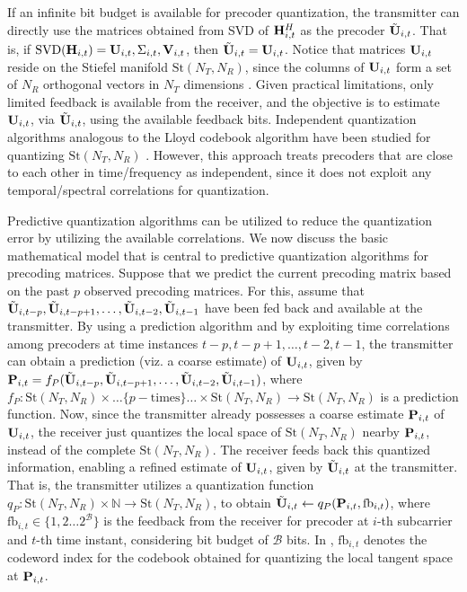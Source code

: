 \documentclass[conference]{IEEEtran}
\begin{document}
If an infinite bit budget is available for precoder quantization, the transmitter can directly use the matrices obtained from SVD of ${\bf H}^{H}_{i,t}$ as the precoder $\tilde{{\bf U}}_{i,t}$. 
That is, if $\text{SVD}({\bf H}_{i,t}) = {\bf U}_{i,t},\Sigma_{i,t}, {\bf V}_{i,t}$, then $\tilde{{\bf U}}_{i,t} = {\bf U}_{i,t}$.
Notice that matrices ${\bf U}_{i,t}$ reside on the Stiefel manifold $\text{St}(N_T,N_R)$, since the columns of ${\bf U}_{i,t}$ form a set of $N_R$ orthogonal vectors in $N_T$ dimensions \cite{Gupt1905:Predictive,6891198}.
Given practical limitations, only limited feedback is available from the receiver, and the objective is to estimate ${\bf U}_{i,t}$, via $\tilde{{\bf U}}_{i,t}$, using the available feedback bits. Independent quantization algorithms analogous to the Lloyd codebook algorithm have been studied for quantizing $\text{St}(N_T,N_R)$ \cite{6678348}.
However, this approach treats precoders that are close to each other in time/frequency as independent, since it does not exploit any temporal/spectral correlations for quantization.

Predictive quantization algorithms \cite{Gupt1905:Predictive,6891198} can be utilized to reduce the quantization error by utilizing the available correlations.
We now discuss the basic mathematical model that is central to predictive quantization algorithms for precoding matrices.
Suppose that we predict the current precoding matrix based on the past $p$ observed precoding matrices. For this, assume that $\tilde{{\bf U}}_{i,t-p},\tilde{{\bf U}}_{i,t-p+1},\ldots,\tilde{{\bf U}}_{i,t-2},\tilde{{\bf U}}_{i,t-1}$ have been fed back and available at the transmitter.
By using a prediction algorithm and by exploiting time correlations among precoders at time instances $t-p,t-p+1,\ldots,t-2,t-1$, the transmitter can obtain a prediction (viz. a coarse estimate) of ${\bf U}_{i,t}$, given by ${\bf P}_{i,t}=f_P(\tilde{{\bf U}}_{i,t-p},\tilde{{\bf U}}_{i,t-p+1},\ldots,\tilde{{\bf U}}_{i,t-2},\tilde{{\bf U}}_{i,t-1})$, where $f_P: \text{St}(N_T,N_R)\times\ldots\{p-\text{times}\}\ldots\times\text{St}(N_T,N_R) \to \text{St}(N_T,N_R)$ is a prediction function.
Now, since the transmitter already possesses a coarse estimate ${\bf P}_{i,t}$ of ${\bf U}_{i,t}$, the receiver just quantizes the local space of $\text{St}(N_T,N_R)$ nearby ${\bf P}_{i,t}$, instead of the complete $\text{St}(N_T,N_R)$. The receiver feeds back this quantized information, enabling a refined estimate of ${\bf U}_{i,t}$, given by $\tilde{{\bf U}}_{i,t}$ at the transmitter.
That is, the transmitter utilizes a quantization function $q_P:\text{St}(N_T,N_R) \times \mathbb{N} \to \text{St}(N_T,N_R)$, to obtain $\tilde{{\bf U}}_{i,t} \gets q_P({\bf P}_{i,t},\text{fb}_{i,t})$, where $\text{fb}_{i,t} \in \{1,2\ldots2^{\mathcal{B}}\}$ is the feedback from the receiver for precoder at $i$-th subcarrier and $t$-th time instant, considering bit budget of $\mathcal{B}$ bits.
In \cite{Gupt1905:Predictive,6891198,6545375}, $\text{fb}_{i,t}$ denotes the codeword index for the codebook obtained for quantizing the local tangent space at ${\bf P}_{i,t}$.
\end{document}
